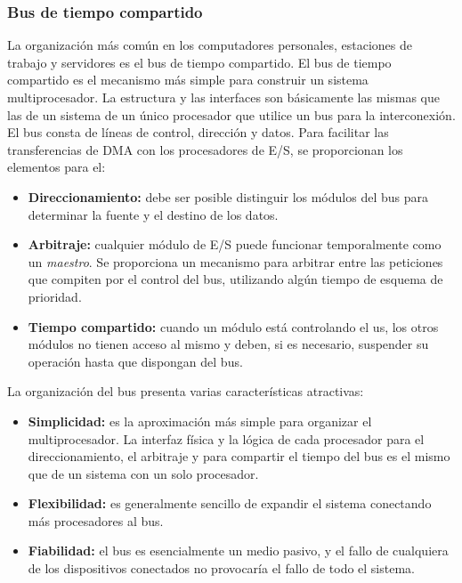 \subsubsection*{Bus de tiempo compartido}

La organización más común en los computadores personales, estaciones de trabajo y servidores es el bus de tiempo compartido. El bus de tiempo compartido es el mecanismo más simple para construir un sistema multiprocesador. La estructura y las interfaces son básicamente las mismas que las de un sistema de un único procesador que utilice un bus para la interconexión. El bus consta de líneas de control, dirección y datos. Para facilitar las transferencias de DMA con los procesadores de E/S, se proporcionan los elementos para el:

\begin{itemize}
  \item \textbf{Direccionamiento:} debe ser posible distinguir los módulos del bus para determinar la fuente y el destino de los datos.
  \item \textbf{Arbitraje:} cualquier módulo de E/S puede funcionar temporalmente como un \textit{maestro}. Se proporciona un mecanismo para arbitrar entre las peticiones que compiten por el control del bus, utilizando algún tiempo de esquema de prioridad.
  \item \textbf{Tiempo compartido:} cuando un módulo está controlando el us, los otros módulos no tienen acceso al mismo y deben, si es necesario, suspender su operación hasta que dispongan del bus.
\end{itemize}

La organización del bus presenta varias características atractivas:

\begin{itemize}
  \item \textbf{Simplicidad:} es la aproximación más simple para organizar el multiprocesador. La interfaz física y la lógica de cada procesador para el direccionamiento, el arbitraje y para compartir el tiempo del bus es el mismo que de un sistema con un solo procesador.
  \item \textbf{Flexibilidad:} es generalmente sencillo de expandir el sistema conectando más procesadores al bus.
  \item \textbf{Fiabilidad:} el bus es esencialmente un medio pasivo, y el fallo de cualquiera de los dispositivos conectados no provocaría el fallo de todo el sistema.
\end{itemize}

